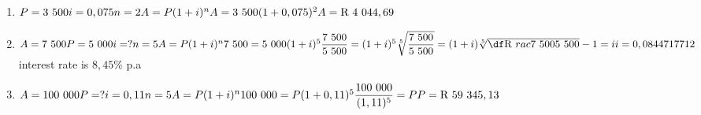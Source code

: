  \begin{solutions}{}{
\begin{enumerate}[itemsep=5pt, label=\textbf{\arabic*}. ] 


\item $P = 3~500\\
i=0,075\\
n=2\\
A=P(1 + i)^{n}\\
A = 3~500(1 + 0,075)^{2}\\
A = \mbox{R }4~044,69$
\item $A = 7~500
P = 5~000\\
i=?\\
n=5\\
A=P(1 + i)^{n}\\
7~500 = 5~000(1 + i)^{5}\\[4pt]
\dfrac{7~500}{5~500} = (1+i)^5\\[4pt]
\sqrt[5]{\dfrac{7~500}{5~500}} = (1+i)\\[4pt]
\sqrt[5]{\df\mbox{R }rac{7~500}{5~500}} - 1 = i\\[4pt]
i = 0,0844717712$\\
interest rate is $8,45 \%$ p.a
\item $A = 100~000\\
P=?\\
i=0,11\\
n=5\\
A=P(1 + i)^{n}\\
100~000 = P(1 + 0,11)^{5}\\[4pt]
\dfrac{100~000}{(1,11)^5} = P\\[4pt]
P = \mbox{R }59~345,13$

\end{enumerate}
}
\end{solutions}

